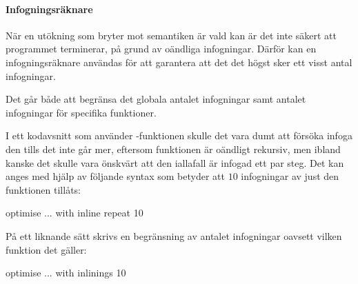 \documentclass[../Optimise]{subfiles}
\begin{document}
\paragraph{Infogningsräknare}
När en utökning som bryter mot semantiken är vald kan är det inte säkert
att programmet terminerar, på grund av oändliga infogningar. 
Därför kan en infogningsräknare användas för att garantera
att det det högst sker ett visst antal infogningar.

Det går både att begränsa det globala antalet infogningar samt antalet infogningar för specifika funktioner.

I ett kodavsnitt som använder -funktionen skulle det vara dumt att
försöka infoga den tills det inte går mer, eftersom funktionen är oändligt rekursiv,
men ibland kanske det skulle vara önskvärt att den iallafall är infogad ett par steg.
Det kan anges med hjälp av följande syntax som betyder att
$10$ infogningar av just den funktionen tillåts:

\begin{codeEx}
optimise ... with { inline repeat 10 }
\end{codeEx}

På ett liknande sätt skrivs en begränsning av antalet infogningar oavsett vilken funktion det gäller:

\begin{codeEx}
optimise ... with { inlinings 10 }
\end{codeEx}
\end{document}
